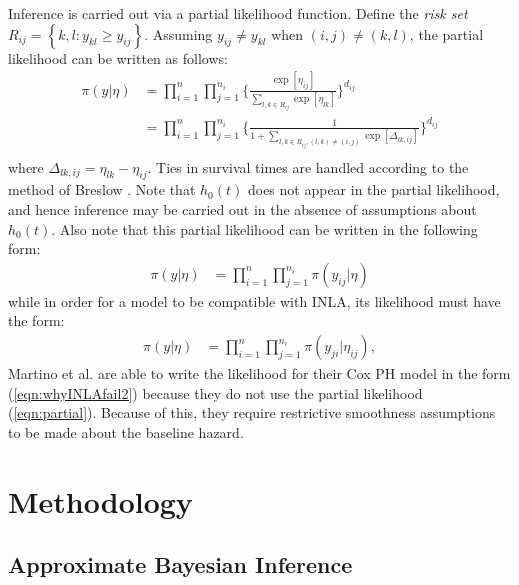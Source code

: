 \documentclass[num-refs,serif,10pt]{wiley-article}
\begin{document}
Inference is carried out via a partial likelihood function. Define the \textit{risk set} $R_{ij} = \left\{k,l : y_{kl} \geq y_{ij}\right\}$. Assuming $y_{ij} \neq y_{kl}$ when $(i,j) \neq (k,l)$, the partial likelihood can be written as follows: 
\begin{equation}\begin{aligned}\label{eqn:partial}
\pi(y|\eta) &= \prod_{i=1}^{n}\prod_{j=1}^{n_{i}} \bigg\{\frac{\exp[\eta_{ij}]}{{\sum_{l,k\in R_{ij}}^{}\exp[\eta_{lk}]}}\bigg \}^{d_{ij}} \\
&= \prod_{i=1}^{n}\prod_{j=1}^{n_{i}} \bigg\{\frac{1}{{1 + \sum_{l,k\in R_{ij} , (l,k) \neq (i,j)}\exp[\Delta_{lk,ij}]}}\bigg \}^{d_{ij}} \\
\end{aligned}\end{equation}
where $\Delta_{lk,ij} = \eta_{lk} - \eta_{ij}$. Ties in survival times are handled according to the method of Breslow \cite{Breslow}. Note that $h_{0}(t)$ does not appear in the partial likelihood, and hence inference may be carried out in the absence of assumptions about $h_{0}(t)$. Also note that this partial likelihood can be written in the following form:
\begin{equation}\begin{aligned}\label{eqn:whyINLAfail1}
\pi(y|\eta) &= \prod_{i=1}^{n}\prod_{j=1}^{n_{i}} \pi(y_{ij}|\eta)
\end{aligned}\end{equation}
while in order for a model to be compatible with INLA, its likelihood must have the form:
\begin{equation}\begin{aligned}\label{eqn:whyINLAfail2}
\pi(y|\eta) &= \prod_{i=1}^{n}\prod_{j=1}^{n_{i}} \pi(y_{ji}|\eta_{ij}),
\end{aligned}\end{equation}
Martino et al. \cite{inlacoxph} are able to write the likelihood for their Cox PH model in the form (\ref{eqn:whyINLAfail2}) because they do not use the partial likelihood (\ref{eqn:partial}). Because of this, they require restrictive smoothness assumptions to be made about the baseline hazard.


\section{Methodology}\label{sec:method}

\subsection{Approximate Bayesian Inference}
\end{document}
